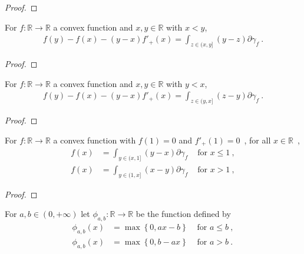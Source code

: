 \begin{proof}%
\uses{}

\end{proof}

\begin{lemma}
  \label{lem:convex_taylor_gt}
  For $f: \mathbb{R} \to \mathbb{R}$ a convex function and $x,y \in \mathbb{R}$ with $x < y$,
  \begin{align*}
  f(y) - f(x) - (y - x)f'_+(x) = \int_{z \in (x,y]} (y - z) \partial \gamma_f \: .
  \end{align*}
\end{lemma}

\begin{proof}%
\uses{}

\end{proof}

\begin{lemma}
  \label{lem:convex_taylor_lt}
  For $f: \mathbb{R} \to \mathbb{R}$ a convex function and $x,y \in \mathbb{R}$ with $y < x$,
  \begin{align*}
  f(y) - f(x) - (y - x)f'_+(x) = \int_{z \in (y,x]} (z - y) \partial \gamma_f \: .
  \end{align*}
\end{lemma}

\begin{proof}%
\uses{}

\end{proof}

\begin{corollary}
  \label{cor:convex_taylor_one}
  For $f: \mathbb{R} \to \mathbb{R}$ a convex function with $f(1) = 0$ and $f'_+(1) = 0$~, for all $x \in \mathbb{R}$~,
  \begin{align*}
  f(x) &= \int_{y \in (x, 1]} (y - x) \partial\gamma_f & \text{ for } x \le 1 \: ,
  \\
  f(x) &= \int_{y \in (1, x]} (x - y) \partial\gamma_f & \text{ for } x > 1 \: ,
  \end{align*}
\end{corollary}

\begin{proof}%
{}

\end{proof}

\begin{definition}
  \label{def:statInfoFun}
  \uses{}
  For $a,b \in (0, +\infty)$ let $\phi_{a,b} : \mathbb{R} \to \mathbb{R}$ be the function defined by
  \begin{align*}
  \phi_{a,b}(x) &= \max\left\{0, a x - b \right\} & \text{ for } a \le b \: ,
  \\
  \phi_{a,b}(x) &= \max\left\{0, b - a x \right\} & \text{ for } a > b \: .
  \end{align*}
\end{definition}


